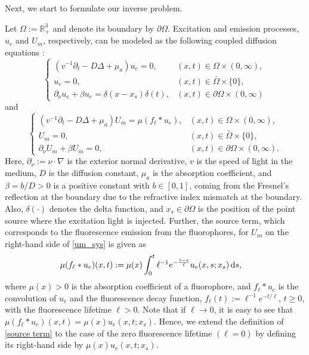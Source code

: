 \documentclass[10pt]{article}
\numberwithin{equation}{section}
\numberwithin{figure}{section}
\begin{document}
Next, we start to formulate our inverse problem. 
\begin{comment}
We first consider the measurements of the fluorescence targets in tissue like the human chest, which is considerably larger than the measurable distances, resulting in the boundary being an approximately infinite plane. 
\end{comment}
Let $\Omega:={\mathbb R}_+^3$ and denote its boundary by $\partial\Omega$. Excitation and emission processes, $u_e$ and $U_m$, respectively, can be modeled as the following coupled diffusion equations \cite{Liu2022}:
\begin{equation}\label{ue_sys}
\left\{
\begin{array}{ll}
\left(v^{-1} \partial_t-D \Delta+\mu_a\right) u_e=0, & (x, t) \in \Omega \times(0, \infty), \\ 
u_e=0, & (x, t) \in \bar{\Omega} \times\{0\}, \\
\partial_\nu u_e+\beta u_e=\delta\left(x-x_s\right) \delta(t), & (x, t) \in \partial \Omega \times(0, \infty)
\end{array}
\right.
\end{equation}
and
\begin{equation}\label{um_sys}
\left\{
\begin{array}{ll}
\left(v^{-1} \partial_t-D \Delta+\mu_a\right) U_m=
\mu (f_\ell \ast u_e), & (x, t) \in \Omega \times(0, \infty), \\ 
U_m=0, & (x, t) \in \bar{\Omega} \times\{0\}, \\
\partial_\nu U_m+\beta U_m=0, & (x, t) \in \partial \Omega \times(0, \infty).
\end{array}
\right.
\end{equation}
Here, $\partial_\nu:=\nu \cdot \nabla$ is the exterior normal derivative, $v$ is the speed of light in the medium, $D$ is the diffusion constant, $\mu_a$ is the absorption coefficient, and $\beta=b/D>0$ is a positive constant with $b\in[0,1]$, coming from the Fresnel's reflection at the boundary due to the refractive index mismatch at the boundary. Also, $\delta(\cdot)$ denotes the delta function, and $x_s\in\partial\Omega $ is the position of the point source where the excitation light is injected. Further, the source term, which corresponds to the fluorescence emission from the fluorophores, for $U_m$ on the right-hand side of \eqref{um_sys} is given as  
\begin{equation}\label{source term}
\begin{split}
\mu (f_\ell \ast u_e) (x,t) 
&:= \mu(x) \int_0^t \ell^{-1}e^{-\frac{t-s}{\ell}} u_e(x, s; x_s)\,{\rm d}s,
\end{split}
\end{equation}
where  $\mu(x)>0$ is the absorption coefficient of a fluorophore, and $f_\ell\ast u_e$ is the convolution of $u_e$ and the fluorescence decay function, $f_\ell(t):=\ell^{-1}e^{-t/\ell},\,t\ge0$, with the fluorescence lifetime $\ell>0$. 
Note that if $\ell\rightarrow 0$, it is easy to see that $\mu(f_\ell\ast u_e)(x,t)=\mu(x)u_e(x,t;x_s)$. Hence, we extend the definition of \eqref{source term} to the case of the zero fluorescence lifetime $(\ell=0)$ by defining its right-hand side by $\mu(x)u_e(x,t;x_s)$.
\medskip
\end{document}
